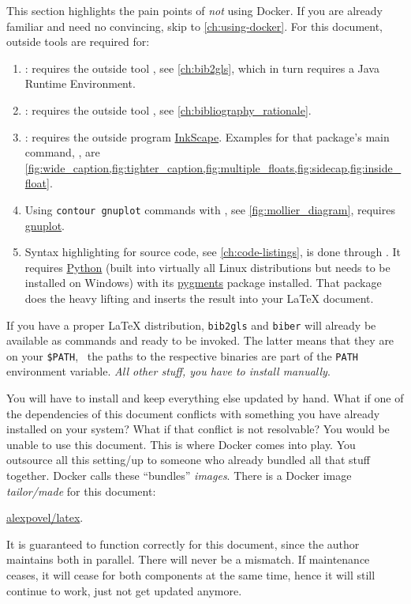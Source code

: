 This section highlights the pain points of \emph{not} using Docker.
If you are already familiar and need no convincing, skip to \cref{ch:using-docker}.
For this document, outside tools are required for:
\begin{enumerate}
    \item {}: requires the outside tool
        , see \cref{ch:bib2gls}, which in turn requires
        a Java Runtime Environment.
    \item {}: requires the outside tool ,
        see \cref{ch:bibliography_rationale}.
    \item {}: requires the outside program
        \href{https://inkscape.org/}{InkScape}.
        Examples for that package's main command, \verb||, are
        \cref{fig:wide_caption,fig:tighter_caption,fig:multiple_floats,fig:sidecap,fig:inside_float}.
    \item Using \texttt{contour gnuplot} commands with , see
        \cref{fig:mollier_diagram}, requires
        \href{http://www.gnuplot.info/download.html}{gnuplot}.
    \item Syntax highlighting for source code, see \cref{ch:code-listings},
        is done through .
        It requires \href{https://www.python.org/}{Python} (built into virtually all Linux
        distributions but needs to be installed on Windows) with its
        \href{https://pypi.org/project/Pygments/}{pygments} package installed.
        That package does the heavy lifting and  inserts the result
        into your \LaTeX{} document.
\end{enumerate}

If you have a proper \LaTeX{} distribution, \texttt{bib2gls} and \texttt{biber}
will already be available as commands and ready to be invoked.
The latter means that they are on your \texttt{\$PATH}, \ the paths to
the respective binaries are part of the \texttt{PATH} environment variable.
\emph{All other stuff, you have to install manually}.

You will have to install and keep everything else updated by hand.
What if one of the dependencies of this document conflicts with something you have already
installed on your system?
What if that conflict is not resolvable?
You would be unable to use this document.
This is where Docker comes into play.
You outsource all this setting\-/up to someone who already bundled all that stuff together.
Docker calls these \enquote{bundles} \emph{images}.
There is a Docker image \emph{tailor\-/made} for this document:
\begin{center}
    \href{https://hub.docker.com/r/alexpovel/latex}{alexpovel/latex}.
\end{center}
It is guaranteed to function correctly for this document, since the author maintains both
in parallel.
There will never be a mismatch.
If maintenance ceases, it will cease for both components at the same time, hence it will
still continue to work, just not get updated anymore.

